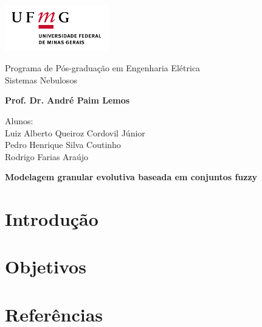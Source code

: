 \documentclass[12pt, a4paper]{article}
\begin{document}
\begin{minipage}[c][3cm][c]{3cm}
\includegraphics[height=2cm]{ufmg.jpg}
\end{minipage}
\begin{minipage}[c][3cm][c]{10cm}
\center
{\sc Programa de Pós-graduação em Engenharia Elétrica}\\
{\sc Sistemas Nebulosos}

\textbf{\footnotesize{Prof. Dr. André Paim Lemos}}
\smallskip
\end{minipage}

\vspace{.5cm}

\noindent Alunos:\\ 
Luiz Alberto Queiroz Cordovil Júnior\\Pedro Henrique Silva Coutinho\\Rodrigo Farias Araújo\\
\begin{center}
\textbf{Modelagem granular evolutiva baseada em conjuntos fuzzy} %
\end{center}

\section{Introdução}

\section{Objetivos}

\section{Referências}
\end{document}
